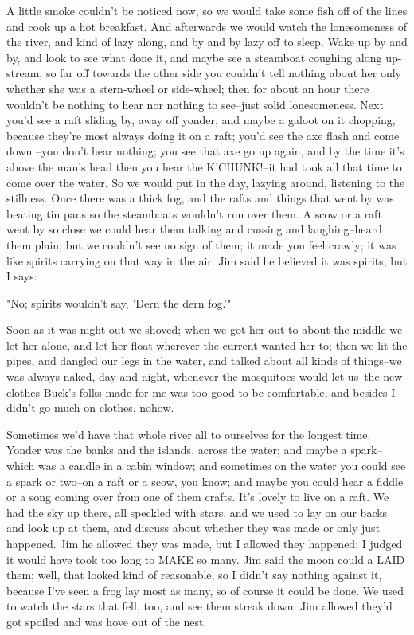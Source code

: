 A little smoke couldn't be noticed now, so we would take some fish off of
the lines and cook up a hot breakfast.  And afterwards we would watch the
lonesomeness of the river, and kind of lazy along, and by and by lazy off
to sleep.  Wake up by and by, and look to see what done it, and maybe see
a steamboat coughing along up-stream, so far off towards the other side
you couldn't tell nothing about her only whether she was a stern-wheel or
side-wheel; then for about an hour there wouldn't be nothing to hear nor
nothing to see--just solid lonesomeness.  Next you'd see a raft sliding
by, away off yonder, and maybe a galoot on it chopping, because they're
most always doing it on a raft; you'd see the axe flash and come down
--you don't hear nothing; you see that axe go up again, and by the time
it's above the man's head then you hear the K'CHUNK!--it had took all
that time to come over the water.  So we would put in the day, lazying
around, listening to the stillness.  Once there was a thick fog, and the
rafts and things that went by was beating tin pans so the steamboats
wouldn't run over them.  A scow or a raft went by so close we could hear
them talking and cussing and laughing--heard them plain; but we couldn't
see no sign of them; it made you feel crawly; it was like spirits
carrying on that way in the air.  Jim said he believed it was spirits;
but I says:

"No; spirits wouldn't say, 'Dern the dern fog.'"

Soon as it was night out we shoved; when we got her out to about the
middle we let her alone, and let her float wherever the current wanted
her to; then we lit the pipes, and dangled our legs in the water, and
talked about all kinds of things--we was always naked, day and night,
whenever the mosquitoes would let us--the new clothes Buck's folks made
for me was too good to be comfortable, and besides I didn't go much on
clothes, nohow.

Sometimes we'd have that whole river all to ourselves for the longest
time. Yonder was the banks and the islands, across the water; and maybe a
spark--which was a candle in a cabin window; and sometimes on the water
you could see a spark or two--on a raft or a scow, you know; and maybe
you could hear a fiddle or a song coming over from one of them crafts.
It's lovely to live on a raft.  We had the sky up there, all speckled
with stars, and we used to lay on our backs and look up at them, and
discuss about whether they was made or only just happened.  Jim he
allowed they was made, but I allowed they happened; I judged it would
have took too long to MAKE so many.  Jim said the moon could a LAID them;
well, that looked kind of reasonable, so I didn't say nothing against it,
because I've seen a frog lay most as many, so of course it could be done.
We used to watch the stars that fell, too, and see them streak down.  Jim
allowed they'd got spoiled and was hove out of the nest.

